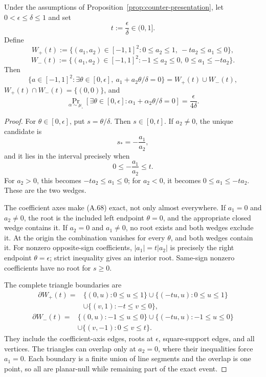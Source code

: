 \begin{lemma}
\label{lem:counter-wedges}
Under the assumptions of Proposition~\ref{prop:counter-presentation}, let
$0<\epsilon\leq\delta\leq1$ and set
\[
t:=\frac\epsilon\delta\in(0,1].
\]
Define
\[
W_+(t):=\{(a_1,a_2)\in[-1,1]^2:
0\leq a_2\leq1,\ -ta_2\leq a_1\leq0\},
\tag{A.66}
\]
\[
W_-(t):=\{(a_1,a_2)\in[-1,1]^2:
-1\leq a_2\leq0,\ 0\leq a_1\leq-ta_2\}.
\tag{A.67}
\]
Then
\[
\{a\in[-1,1]^2:\exists\theta\in[0,\epsilon],
 \ a_1+a_2\theta/\delta=0\}
=W_+(t)\cup W_-(t),
\tag{A.68}
\]
$W_+(t)\cap W_-(t)=\{(0,0)\}$, and
\[
\Pr_{\alpha\sim\mu_\square}
[\exists\theta\in[0,\epsilon]:
 \alpha_1+\alpha_2\theta/\delta=0]
=\frac{\epsilon}{4\delta}.
\tag{A.69}
\]
\end{lemma}

\begin{proof}
For $\theta\in[0,\epsilon]$, put $s=\theta/\delta$.  Then
$s\in[0,t]$.  If $a_2\neq0$, the unique candidate is
\[
s_*=-\frac{a_1}{a_2},
\]
and it lies in the interval precisely when
\[
0\leq-\frac{a_1}{a_2}\leq t.
\tag{A.70}
\]
For $a_2>0$, this becomes $-ta_2\leq a_1\leq0$; for $a_2<0$, it becomes
$0\leq a_1\leq-ta_2$.  These are the two wedges.

The coefficient axes make (A.68) exact, not only almost everywhere.  If
$a_1=0$ and $a_2\neq0$, the root is the included left endpoint
$\theta=0$, and the appropriate closed wedge contains it.  If $a_2=0$ and
$a_1\neq0$, no root exists and both wedges exclude it.  At the origin the
combination vanishes for every $\theta$, and both wedges contain it.  For
nonzero opposite-sign coefficients, $|a_1|=t|a_2|$ is precisely the right
endpoint $\theta=\epsilon$; strict inequality gives an interior root.
Same-sign nonzero coefficients have no root for $s\geq0$.

The complete triangle boundaries are
\[
\begin{aligned}
\partial W_+(t)
={}&\{(0,u):0\leq u\leq1\}
\cup\{(-tu,u):0\leq u\leq1\}\\
&\cup\{(v,1):-t\leq v\leq0\},
\end{aligned}
\tag{A.71}
\]
\[
\begin{aligned}
\partial W_-(t)
={}&\{(0,u):-1\leq u\leq0\}
\cup\{(-tu,u):-1\leq u\leq0\}\\
&\cup\{(v,-1):0\leq v\leq t\}.
\end{aligned}
\tag{A.72}
\]
They include the coefficient-axis edges, roots at $\epsilon$, square-support
edges, and all vertices.  The triangles can overlap only at $a_2=0$, where
their inequalities force $a_1=0$.  Each boundary is a finite union of line
segments and the overlap is one point, so all are planar-null while remaining
part of the exact event.


\end{proof}
